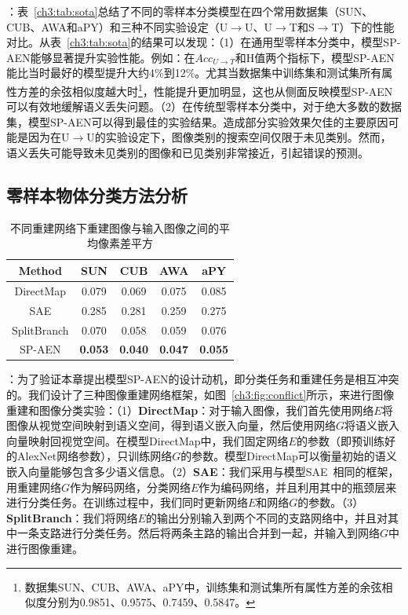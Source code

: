 \textbf{}：表~\ref{ch3:tab:sota}总结了不同的零样本分类模型在四个常用数据集（SUN、CUB、AWA和aPY）和三种不同实验设定（U$\to$U、U$\to$T和S$\to$T）下的性能对比。从表~\ref{ch3:tab:sota}的结果可以发现：（1）在通用型零样本分类中，模型SP-AEN能够显著提升实验性能。例如：在$Acc_{U\to T}$和H值两个指标下，模型SP-AEN能比当时最好的模型提升大约4\%到12\%。尤其当数据集中训练集和测试集所有属性方差的余弦相似度越大时\footnote{数据集SUN、CUB、AWA、aPY中，训练集和测试集所有属性方差的余弦相似度分别为0.9851、0.9575、0.7459、0.5847。}，性能提升更加明显，这也从侧面反映模型SP-AEN可以有效地缓解语义丢失问题。（2）在传统型零样本分类中，对于绝大多数的数据集，模型SP-AEN可以得到最佳的实验结果。造成部分实验效果欠佳的主要原因可能是因为在U$\to$U的实验设定下，图像类别的搜索空间仅限于未见类别。然而，语义丢失可能导致未见类别的图像和已见类别非常接近，引起错误的预测。

\subsection{零样本物体分类方法分析}

\begin{table}[t]
\centering
\begin{tabular}{|c | c| c| c| c|}
\hline
Method & \textbf{SUN} & \textbf{CUB} & \textbf{AWA} & \textbf{aPY} \\
\hline
 DirectMap & 0.079 & 0.069 & 0.075 & 0.085 \\
 SAE & 0.285 & 0.281 & 0.259 &  0.275\\
SplitBranch & 0.070 & 0.058  & 0.059 & 0.076 \\
SP-AEN & \textbf{0.053}  & \textbf{0.040}& \textbf{0.047} & \textbf{0.055} \\
\hline
\end{tabular}
\caption{不同重建网络下重建图像与输入图像之间的平均像素差平方}
\label{ch3:tab:conflict_quantitative}
\end{table}

\textbf{}：为了验证本章提出模型SP-AEN的设计动机，即分类任务和重建任务是相互冲突的。我们设计了三种图像重建网络框架，如图~\ref{ch3:fig:conflict}所示，来进行图像重建和图像分类实验：（1）\textbf{DirectMap}：对于输入图像，我们首先使用网络$E$将图像从视觉空间映射到语义空间，得到语义嵌入向量，然后使用网络$G$将语义嵌入向量映射回视觉空间。在模型DirectMap中，我们固定网络$E$的参数（即预训练好的AlexNet网络参数），只训练网络$G$的参数。模型DirectMap可以衡量初始的语义嵌入向量能够包含多少语义信息。（2）\textbf{SAE}：我们采用与模型SAE~\cite{kodirov2017semantic}相同的框架，用重建网络$G$作为解码网络，分类网络$E$作为编码网络，并且利用其中的瓶颈层来进行分类任务。在训练过程中，我们同时更新网络$E$和网络$G$的参数。（3）\textbf{SplitBranch}：我们将网络$E$的输出分别输入到两个不同的支路网络中，并且对其中一条支路进行分类任务。然后将两条主路的输出合并到一起，并输入到网络$G$中进行图像重建。


